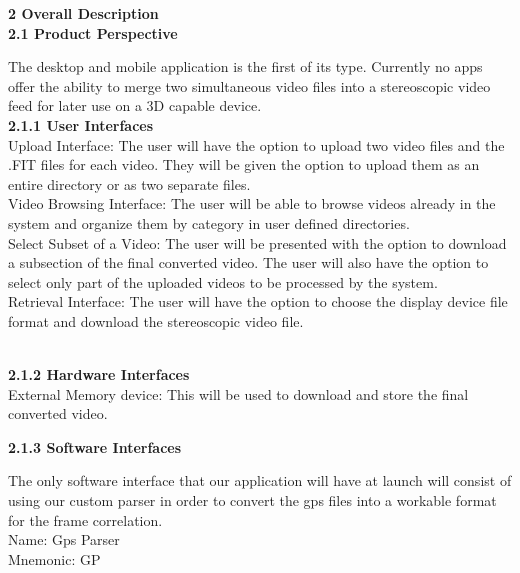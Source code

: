 \documentclass[10pt,draftclsnofoot,onecolumn]{IEEEtran}
\begin{document}
{\Large\textbf{2 Overall Description}} \\
\vspace{5mm}
{\Medium\textbf{2.1 Product Perspective}} \\
\vspace{5mm}

The desktop and mobile application is the first of its type. Currently no apps offer the ability to merge two simultaneous video files into a stereoscopic video feed for later use on a 3D capable device.\\
\vspace{5mm}
{\Medium\textbf{2.1.1 User Interfaces}} \\

\vspace{5mm}
Upload Interface: The user will have the option to upload two video files and the .FIT files for each video. They will be given the option to upload them as an entire directory or as two separate files.\\
\vspace{2mm}
			Video Browsing Interface: The user will be able to browse videos already in the system and organize them by category in user defined directories.\\
			\vspace{2mm}
Select Subset of a Video: The user will be presented with the option to download a subsection of the final converted video. The user will also have the option to select only part of the uploaded videos to be processed by the system.\\
\vspace{2mm}
Retrieval Interface: The user will have the option to choose the display device file format and download the stereoscopic video file.

\\
\vspace{5mm}
{\Medium\textbf{2.1.2 Hardware Interfaces}} \\

\vspace{5mm}
External Memory device: This will be used to download and store the final converted video.
\vspace{5mm}


{\Medium\textbf{2.1.3 Software Interfaces}} \\

\vspace{5mm}

The only software interface that our application will have at launch will consist of using our custom parser in order to convert the gps files into a workable format for the frame correlation. \\
			Name: Gps Parser\\
			Mnemonic: GP\\
\end{document}
